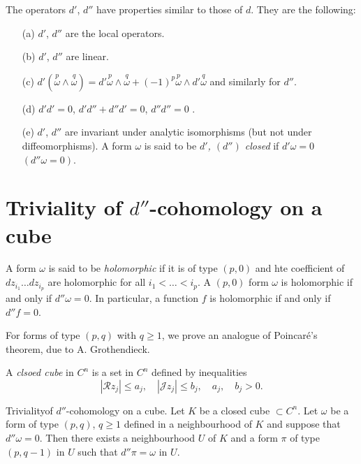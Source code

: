 The operators $d'$, $d''$ have properties similar to those of
$d$. They are the following:
\begin{itemize}
\item[(a)] $d'$, $d''$ are the local operators.

\item[(b)] $d'$, $d''$ are linear.

\item[(c)] $d'(\overset{p}{\omega} \wedge \overset{q}{\omega}) = d'
  \overset{p}{\omega} \wedge \overset{q}{\omega} + (-1)^p
  \overset{p}{\omega} \wedge d' \overset{q}{\omega}$ and similarly for
  $d''$. 

\item[(d)] $d'd' = 0$, $d'd'' + d'' d' = 0$, $d'' d'' = 0$ . 

\item[(e)] $d'$, $d''$ are invariant under analytic isomorphisms (but
  not under diffeomorphisms). A form $\omega$ is said to be
  \textit{$d'$, $(d'')$ closed} if $d'\omega =0$ $(d''\omega =0)$. 
\end{itemize}

\section{Triviality of \texorpdfstring{$d''$}{d''}-cohomology on a cube}\label{chap8:sec3}

A form $\omega$ is said to be \textit{holomorphic} if it is of type
$(p,0)$ and hte coefficient of $dz_{i_1} \ldots dz_{i_p}$ are
holomorphic for all $i_1 < \ldots < i_p$. A $(p,0)$ form $\omega$ is
holomorphic if and only if $d'' \omega =0$. In particular, a function
$f$ is holomorphic if and only if $d'' f =0$. 

For forms of type $(p,q)$ with $q \geq 1$, we prove an analogue of
Poin\-car\'e's theorem, due to A. Grothendieck.

A \textit{clsoed cube} in $C^n$ is a set in $C^n$ defined by
inequalities 
$$
|\mathscr{R} z_j| \leq a_j, \quad |\mathscr{J} z_j| \leq b_j, \quad
a_j, \quad b_j > 0. 
$$

\setcounter{thm}{0}
\begin{thm}\label{chap8:thm1}
Triviality\pageoriginale of $d''$-cohomology on a cube. Let $K$ be a
closed cube $\subset C^n$. Let $\omega$ be a form of type $(p,q)$, $q
\geq 1$ defined in a neighbourhood of $K$ and suppose that $d''\omega
= 0$. Then there exists a neighbourhood $U$ of $K$ and a form $\pi$ of
type $(p, q-1)$ in $U$ such that $d''\pi = \omega$ in $U$. 
\end{thm}

